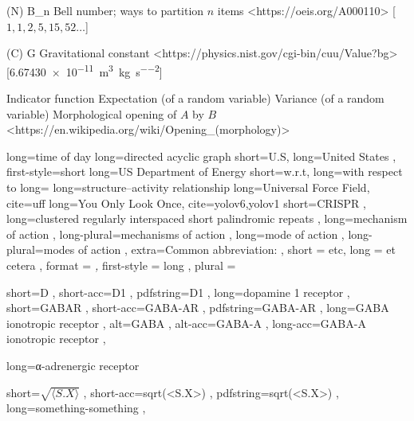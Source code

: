 \NomMath (N) {B_n} {Bell number; ways to partition $n$ items}
    <https://oeis.org/A000110>
    [$1, 1, 2, 5, 15, 52 \ldots$]

\NomMath (C) {G} {Gravitational constant}
    <https://physics.nist.gov/cgi-bin/cuu/Value?bg>
    [\qty{6.67430e-11}{\meter\cubed\per\kilogram\per\second\squared}]

\NomMath {\indicator} {Indicator function}
 {Expectation (of a random variable)}
 {Variance (of a random variable)}
    {Morphological opening of $A$ by $B$}
    <https://en.wikipedia.org/wiki/Opening\_(morphology)>




 {long=time of day}  %
 {long=directed acyclic graph}
 {
    short=U.S\acdot ,
    long=United States ,
    first-style=short     %
}
 {long=\acs{US} Department of Energy}
 {short=w.r.t\acdot, long=with respect to}
 {long=}
 {long=structure–activity relationship}  %
 {long=Universal Force Field, cite=uff}
 {long=You Only Look Once, cite={yolov6,yolov1}}
 {
    short=CRISPR ,
    long=clustered regularly interspaced short palindromic repeats ,
}
 {
    long=mechanism of action ,
	long-plural=mechanisms of action ,
}
 {
    long=mode of action ,
	long-plural=modes of action ,
	extra={Common abbreviation: } ,
}
 {
    short = etc\acdot ,
    long = et cetera ,
    format = \textit ,
    first-style = long ,
    plural =
}

 {
    short=D ,
    short-acc=D1 ,
    pdfstring=D1 ,
    long=dopamine 1 receptor ,
}
 {
    short=GABAR ,
    short-acc=GABA-AR ,
    pdfstring=GABA-AR ,
    long=GABA ionotropic receptor ,
    alt=GABA ,
    alt-acc=GABA-A ,
    long-acc=GABA-A ionotropic receptor ,
}

 {long=α-adrenergic receptor}

 {
    short=$\sqrt{\langle S . X \rangle }$ ,
    short-acc=sqrt(<S.X>) ,
    pdfstring=sqrt(<S.X>) ,
    long=something-something ,
}

